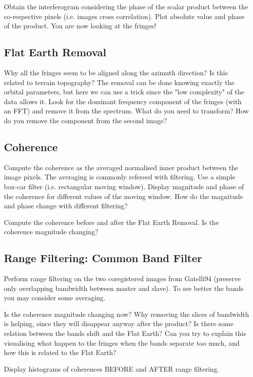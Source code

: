 Obtain the interferogram considering the phase of the scalar product between the co-respective pixels (i.e. images cross correlation). Plot absolute value and phase of the product. You are now looking at the fringes!

\subsection{Flat Earth Removal}
Why all the fringes seem to be aligned along the azimuth direction? Is this related to terrain topography? The removal can be done knowing exactly the orbital parameters, but here we can use a trick since the "low complexity" of the  data allows it. Look for the dominant frequency component of the fringes (with an FFT) and remove it from the spectrum. What do you need to transform? How do you remove the component from the second image?

\subsection{Coherence}
Compute the coherence as the averaged normalised inner product between the image pixels. The averaging is commonly refereed with filtering. Use a simple box-car filter (i.e. rectangular moving window). Display magnitude and phase of the coherence for different values of the moving window. How do the magnitude and phase change with different filtering?

Compute the coherence before and after the Flat Earth Removal. Is the coherence magnitude changing?


\subsection{Range Filtering: Common Band Filter}
Perform range filtering on the two coregistered images from Gatelli94 (preserve only overlapping bandwidth between master and slave). To see better the bands you may consider some averaging.

Is the coherence magnitude changing now? Why removing the slices of bandwidth is helping, since they will disappear anyway after the product? Is there some relation between the bands shift and the Flat Earth? Can you try to explain this visualising what happen to the fringes when the bands separate too much, and how this is related to the Flat Earth?

Display histograms of coherences BEFORE and AFTER range filtering.
